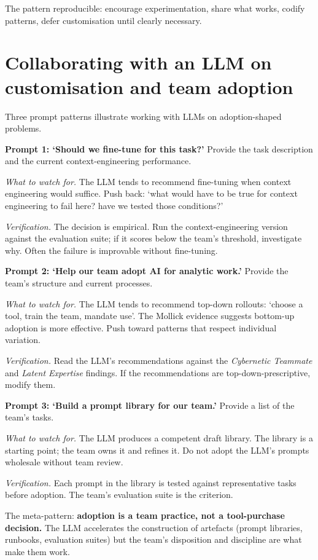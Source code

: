 \documentclass[
  letterpaper,
  11pt]{scrbook}
\begin{document}
The pattern reproducible: encourage experimentation, share what works,
codify patterns, defer customisation until clearly necessary.

\section{Collaborating with an LLM on customisation and team
adoption}\label{collaborating-with-an-llm-on-customisation-and-team-adoption}

Three prompt patterns illustrate working with LLMs on adoption-shaped
problems.

\textbf{Prompt 1: `Should we fine-tune for this task?'} Provide the task
description and the current context-engineering performance.

\emph{What to watch for.} The LLM tends to recommend fine-tuning when
context engineering would suffice. Push back: `what would have to be
true for context engineering to fail here? have we tested those
conditions?'

\emph{Verification.} The decision is empirical. Run the
context-engineering version against the evaluation suite; if it scores
below the team's threshold, investigate why. Often the failure is
improvable without fine-tuning.

\textbf{Prompt 2: `Help our team adopt AI for analytic work.'} Provide
the team's structure and current processes.

\emph{What to watch for.} The LLM tends to recommend top-down rollouts:
`choose a tool, train the team, mandate use'. The Mollick evidence
suggests bottom-up adoption is more effective. Push toward patterns that
respect individual variation.

\emph{Verification.} Read the LLM's recommendations against the
\emph{Cybernetic Teammate} and \emph{Latent Expertise} findings. If the
recommendations are top-down-prescriptive, modify them.

\textbf{Prompt 3: `Build a prompt library for our team.'} Provide a list
of the team's tasks.

\emph{What to watch for.} The LLM produces a competent draft library.
The library is a starting point; the team owns it and refines it. Do not
adopt the LLM's prompts wholesale without team review.

\emph{Verification.} Each prompt in the library is tested against
representative tasks before adoption. The team's evaluation suite is the
criterion.

The meta-pattern: \textbf{adoption is a team practice, not a
tool-purchase decision.} The LLM accelerates the construction of
artefacts (prompt libraries, runbooks, evaluation suites) but the team's
disposition and discipline are what make them work.
\end{document}
